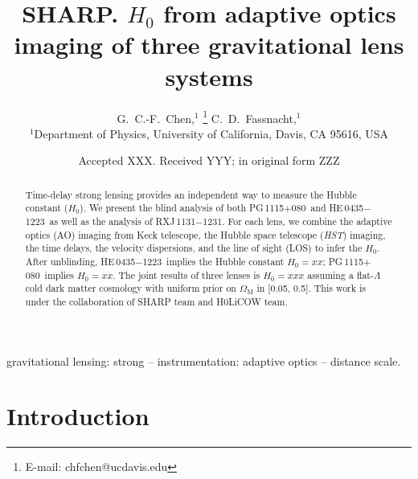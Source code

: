 \documentclass[useAMS,usenatbib]{mnras}
\title[$H_{0}~from~three~AO~lensing~imaging$]{SHARP. $H_{0}$ from adaptive optics imaging of three gravitational lens systems}
\author[G.~ C.-F.~Chen et al.]{
G.~C.-F.~Chen,$^{1}$ \thanks{E-mail: chfchen@ucdavis.edu}
C.~D.~Fassnacht,$^{1}$
\newauthor{
}
\newauthor{
}
\\
$^{1}$Department of Physics, University of California, Davis, CA 95616, USA\\
}
\date{Accepted XXX. Received YYY; in original form ZZZ}
\newcommand\rxj{RXJ\,1131$-$1231}
\newcommand\he{HE\,0435$-$1223}
\newcommand\pg{PG\,1115$+$080}
\def\hst{\textit{HST}}
\def\planck{\textit{planck}}
\begin{document}
\label{firstpage}
\pagerange{\pageref{firstpage}--\pageref{lastpage}}
\maketitle

\begin{abstract}
Time-delay strong lensing provides an independent way to measure the Hubble constant ($H_{0}$). 
We present the blind analysis of both \pg~and \he~as well as the analysis of \rxj. For each lens, we combine the adaptive optics (AO) imaging from Keck telescope, the Hubble space telescope (\hst) imaging, the time delays, the velocity dispersions, and the line of sight (LOS) to infer the $H_{0}$. After unblinding, \he~implies the Hubble constant $H_{0}=xx$; \pg~implies $H_{0}=xx$. The joint results of three lenses is $H_{0}=xxx$ assuming a flat-$\Lambda$ cold dark matter cosmology with uniform prior on $\Omega_{\textrm{M}}$ in [0.05, 0.5]. This work is under the collaboration of SHARP team and H0LiCOW team. 
\end{abstract}

\begin{keywords}
gravitational lensing: strong -- instrumentation: adaptive optics -- distance scale.
\end{keywords}



\section{Introduction}
\end{document}
